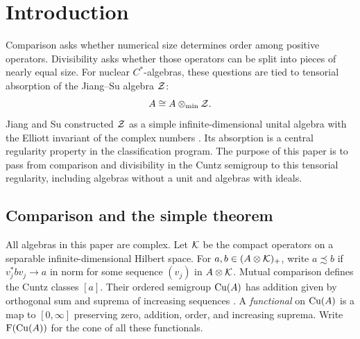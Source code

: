 \begin{abstract}
We prove that strict comparison in the extended-functional sense implies
Jiang--Su absorption for separable simple nuclear non-elementary
$C^*$-algebras. This resolves the corresponding implication of the
Toms--Winter regularity problem, including nonunital algebras and allowing
unbounded traces. More generally, every separable nuclear $C^*$-algebra
whose Cuntz semigroup is almost unperforated and fully almost divisible
absorbs the Jiang--Su algebra.
\end{abstract}

\section{Introduction}
\label{sec:introduction}

Comparison asks whether numerical size determines order among positive
operators. Divisibility asks whether those operators can be split into
pieces of nearly equal size. For nuclear $C^*$-algebras, these questions
are tied to tensorial absorption of the Jiang--Su algebra $\mathcal Z$:
\[
 A\cong A\otimes_{\min}\mathcal Z.
\]
Jiang and Su constructed $\mathcal Z$ as a simple infinite-dimensional unital
algebra with the Elliott invariant of the complex numbers
\cite{JS1999}. Its absorption is a central regularity property in the
classification program. The purpose of this paper is to pass from
comparison and divisibility in the Cuntz semigroup to this tensorial
regularity, including algebras without a unit and algebras with ideals.

\subsection{Comparison and the simple theorem}

All algebras in this paper are complex. Let $\mathcal K$ be the compact
operators on a separable infinite-dimensional Hilbert space. For
$a,b\in(A\otimes\mathcal K)_+$, write $a\precsim b$ if
$v_j^*bv_j\to a$ in norm for some sequence $(v_j)$ in
$A\otimes\mathcal K$. Mutual comparison defines the Cuntz classes $[a]$.
Their ordered semigroup $\mathrm{Cu}(A)$ has addition given by orthogonal
sum and suprema of increasing sequences \cite{CEI2008}. A
\emph{functional} on $\mathrm{Cu}(A)$ is a map to $[0,\infty]$ preserving
zero, addition, order, and increasing suprema. Write
$\mathrm F(\mathrm{Cu}(A))$ for the cone of all these functionals.

